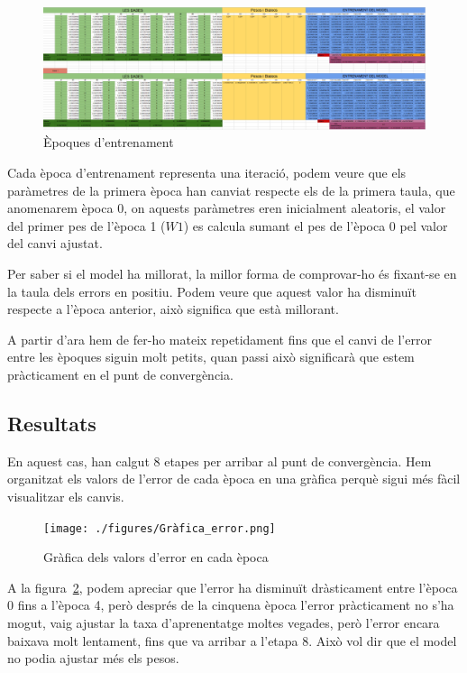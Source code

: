 \begin{figure}[H]
    \centering
    \includegraphics[width=1\textwidth]{./figures/Etapa_1.png}
    \caption{Èpoques d'entrenament}
    \label{f:entrenament}
\end{figure}

Cada època d'entrenament representa una iteració, podem veure que els paràmetres de la primera època han canviat respecte els de la primera taula, que anomenarem època 0, on aquests paràmetres eren inicialment aleatoris, el valor del primer pes de l'època 1 ($W1$) es calcula sumant el pes de l'època 0 pel valor del canvi ajustat.

Per saber si el model ha millorat, la millor forma de comprovar-ho és fixant-se en la taula dels errors en positiu. Podem veure que aquest valor ha disminuït respecte a l'època anterior, això significa que està millorant.

A partir d'ara hem de fer-ho mateix repetidament fins que el canvi de l'error entre les èpoques siguin molt petits, quan passi això significarà que estem pràcticament en el punt de convergència.%

\subsection{Resultats}
En aquest cas, han calgut 8 etapes per arribar al punt de convergència. Hem organitzat els valors de l'error de cada època en una gràfica perquè sigui més fàcil visualitzar els canvis.


\begin{figure}[h!]
    \centering
    \texttt{[image: ./figures/Gràfica\_error.png]}
    \caption{Gràfica dels valors d'error en cada època}
    \label{f:errorsEpoca}
\end{figure}


A la figura~\ref{f:errorsEpoca}, podem apreciar que l'error ha disminuït dràsticament entre l'època 0 fins a l'època 4, però després de la cinquena època l'error pràcticament no s'ha mogut, vaig ajustar la taxa d'aprenentatge moltes vegades, però l'error encara baixava molt lentament, fins que va arribar a l'etapa 8. Això vol dir que el model no podia ajustar més els pesos.


